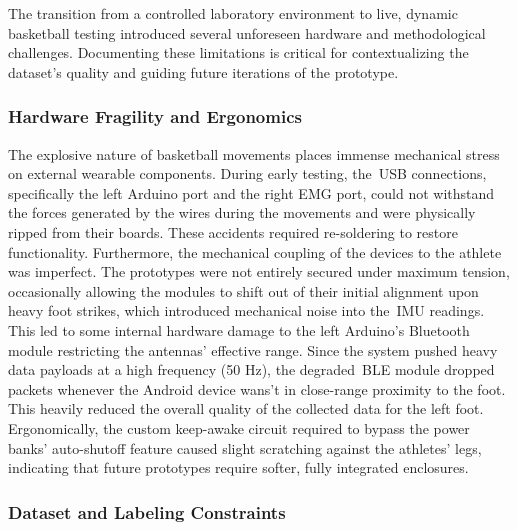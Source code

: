 The transition from a controlled laboratory environment to live, dynamic basketball testing introduced several unforeseen hardware and methodological challenges. Documenting these limitations is critical for 
contextualizing the dataset's quality and guiding future iterations of the prototype.

\subsubsection{Hardware Fragility and Ergonomics}
\label{ssec:problems_hardware}
The explosive nature of basketball movements places immense mechanical stress on external wearable components. During early testing, the~\gls{USB} connections, specifically the left Arduino port and the right 
\gls{EMG} port, could not withstand the forces generated by the wires during the movements and were physically ripped from their boards. These accidents required re-soldering to restore functionality. 
Furthermore, the mechanical coupling of the devices to the athlete was imperfect. The prototypes were not entirely secured under maximum tension, occasionally allowing the modules to shift out of their initial 
alignment upon heavy foot strikes, which introduced mechanical noise into the~\gls{IMU} readings. This led to some internal hardware damage to the left Arduino's Bluetooth module restricting the antennas' effective 
range. Since the system pushed heavy data payloads at a high frequency (50 Hz), the degraded~\gls{BLE} module dropped packets whenever the Android device wans't in close-range proximity to the foot. This heavily 
reduced the overall quality of the collected data for the left foot.
Ergonomically, the custom keep-awake circuit required to bypass the power banks' auto-shutoff feature caused slight scratching against the athletes' legs, indicating that future prototypes require softer, fully 
integrated enclosures.


\subsubsection{Dataset and Labeling Constraints}
\label{ssec:problems_data}

